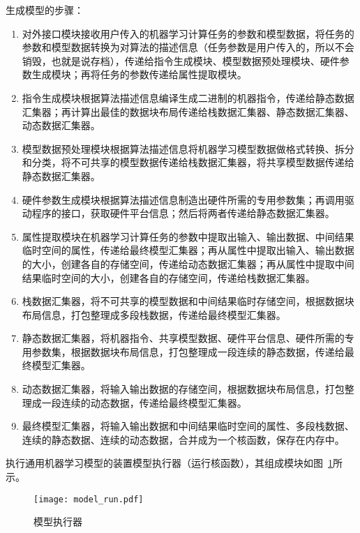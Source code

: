 生成模型的步骤：
\begin{enumerate}
\item 对外接口模块接收用户传入的机器学习计算任务的参数和模型数据，将任务的参数和模型数据转换为对算法的描述信息（任务参数是用户传入的，所以不会销毁，也就是说存档），传递给指令生成模块、模型数据预处理模块、硬件参数生成模块；再将任务的参数传递给属性提取模块。
\item 指令生成模块根据算法描述信息编译生成二进制的机器指令，传递给静态数据汇集器；再计算出最佳的数据块布局传递给栈数据汇集器、静态数据汇集器、动态数据汇集器。
\item 模型数据预处理模块根据算法描述信息将机器学习模型数据做格式转换、拆分和分类，将不可共享的模型数据传递给栈数据汇集器，将共享模型数据传递给静态数据汇集器。
\item 硬件参数生成模块根据算法描述信息制造出硬件所需的专用参数集；再调用驱动程序的接口，获取硬件平台信息；然后将两者传递给静态数据汇集器。
\item 属性提取模块在机器学习计算任务的参数中提取出输入、输出数据、中间结果临时空间的属性，传递给最终模型汇集器；再从属性中提取出输入、输出数据的大小，创建各自的存储空间，传递给动态数据汇集器；再从属性中提取中间结果临时空间的大小，创建各自的存储空间，传递给栈数据汇集器。
\item 栈数据汇集器，将不可共享的模型数据和中间结果临时存储空间，根据数据块布局信息，打包整理成多段栈数据，传递给最终模型汇集器。
\item 静态数据汇集器，将机器指令、共享模型数据、硬件平台信息、硬件所需的专用参数集，根据数据块布局信息，打包整理成一段连续的静态数据，传递给最终模型汇集器。
\item 动态数据汇集器，将输入输出数据的存储空间，根据数据块布局信息，打包整理成一段连续的动态数据，传递给最终模型汇集器。
\item 最终模型汇集器，将输入输出数据和中间结果临时空间的属性、多段栈数据、连续的静态数据、连续的动态数据，合并成为一个核函数，保存在内存中。
\end{enumerate}

执行通用机器学习模型的装置模型执行器（运行核函数），其组成模块如图~\ref{fig:model-run}所示。
\begin{figure}[htb]
  \centering
  \texttt{[image: model\_run.pdf]}
  \caption{模型执行器}
  \label{fig:model-run}
\end{figure}

